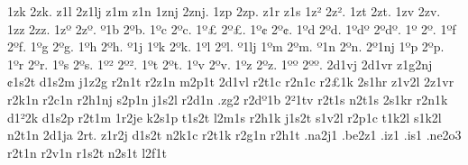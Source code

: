 {1zk
2zk.
z1l
2z1lj
z1m
z1n
1znj
2znj.
1zp
2zp.
z1r
z1s
1z^^b2
2z^^b2.
1zt
2zt.
1zv
2zv.
1zz
2zz.
1z^^ba
2z^^ba.
^^ba1b
2^^bab.
1^^bac
2^^bac.
1^^ba^^a3
2^^ba^^a3.
1^^ba^^a2
2^^ba^^a2.
1^^bad
2^^bad.
1^^bad^^ba
2^^bad^^ba.
1^^ba^^9e
2^^ba^^9e.
1^^baf
2^^baf.
1^^bag
2^^bag.
1^^bah
2^^bah.
^^ba1j
1^^bak
2^^bak.
1^^bal
2^^bal.
^^ba1lj
1^^bam
2^^bam.
^^ba1n
2^^ban.
2^^ba1nj
1^^bap
2^^bap.
1^^bar
2^^bar.
1^^bas
2^^bas.
1^^ba^^b2
2^^ba^^b2.
1^^bat
2^^bat.
1^^bav
2^^bav.
1^^baz
2^^baz.
1^^ba^^ba
2^^ba^^ba.
%
2d1vj
2d1vr
z1g2nj
^^a21s2t
d1s2m
j1z2g
r2n1t
r2z1n
m2p1t
2d1vl
r2t1c
r2n1c
r2^^a31k
2s1hr
z1v2l
2z1vr
r2k1n
r2c1n
r2h1nj
s2p1n
j1s2l
r2d1n
.zg2
r2d^^ba1b
2^^b21tv
r2t1s
n2t1s
2s1kr
r2n1k
d1^^b22k
d1s2p
r2t1m
1r2je
k2s1p
t1s2t
l2m1s
r2h1k
j1s2t
s1v2l
r2p1c
t1k2l
s1k2l
n2t1n
2d1ja
2rt.
z1r2j
d1s2t
n2k1c
r2t1k
r2g1n
r2h1t
.na2j1
.be2z1
.iz1
.is1
.ne2o3
r2t1n
r2v1n
r1s2t
n2s1t
l2f1t
}
\endgroup
